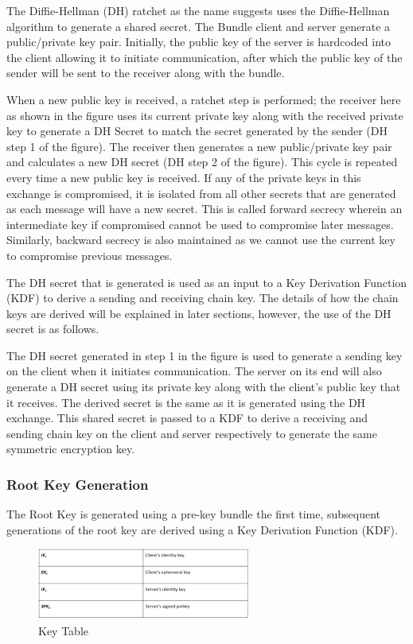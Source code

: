 The Diffie-Hellman (DH) ratchet as the name suggests uses the Diffie-Hellman algorithm to generate a shared secret. The Bundle client and server generate a public/private key pair. Initially, the public key of the server is hardcoded into the client allowing it to initiate communication, after which the public key of the sender will be sent to the receiver along with the bundle.

When a new public key is received, a ratchet step is performed; the receiver here as shown in the figure uses its current private key along with the received private key to generate a DH Secret to match the secret generated by the sender (DH step 1 of the figure). The receiver then generates a new public/private key pair and calculates a new DH secret (DH step 2 of the figure). This cycle is repeated every time a new public key is received.
If any of the private keys in this exchange is compromised, it is isolated from all other secrets that are generated as each message will have a new secret. This is called forward secrecy wherein an intermediate key if compromised cannot be used to compromise later messages. Similarly, backward secrecy is also maintained as we cannot use the current key to compromise previous messages.

The DH secret that is generated is used as an input to a Key Derivation Function (KDF) to derive a sending and receiving chain key. The details of how the chain keys are derived will be explained in later sections, however, the use of the DH secret is as follows.

The DH secret generated in step 1 in the figure is used to generate a sending key on the client when it initiates communication. The server on its end will also generate a DH secret using its private key along with the client’s public key that it receives. The derived secret is the same as it is generated using the DH exchange. This shared secret is passed to a KDF to derive a receiving and sending chain key on the client and server respectively to generate the same symmetric encryption key.

\subsubsection{Root Key Generation}
The Root Key is generated using a pre-key bundle the first time, subsequent generations of the root key are derived using a Key Derivation Function (KDF).

\begin{figure}[ht!]
\centering
\includegraphics[width= 70mm]{./images/Key Table.png}
\caption{Key Table}
\end{figure}

